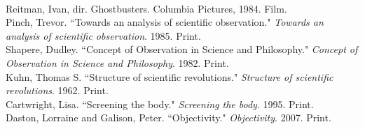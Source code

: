 \documentclass[11pt, oneside]{article}
\begin{document}

\begin{workscited}
\bibent \\
\bibent Reitman, Ivan, dir. Ghostbusters. Columbia Pictures, 1984. Film. \\
\bibent Pinch, Trevor. ``Towards an analysis of scientific observation."  \textit{Towards an analysis of scientific observation}.  1985. Print. \\
\bibent Shapere, Dudley. ``Concept of Observation in Science and Philosophy."  \textit{Concept of Observation in Science and Philosophy}.  1982. Print. \\
\bibent Kuhn, Thomas S. ``Structure of scientific revolutions."  \textit{Structure of scientific revolutions}.  1962. Print. \\
\bibent Cartwright, Lisa. ``Screening the body."  \textit{Screening the body}.  1995. Print. \\
\bibent Daston, Lorraine and Galison, Peter. ``Objectivity."  \textit{Objectivity}.  2007. Print. \\
\end{workscited}
\end{document}
